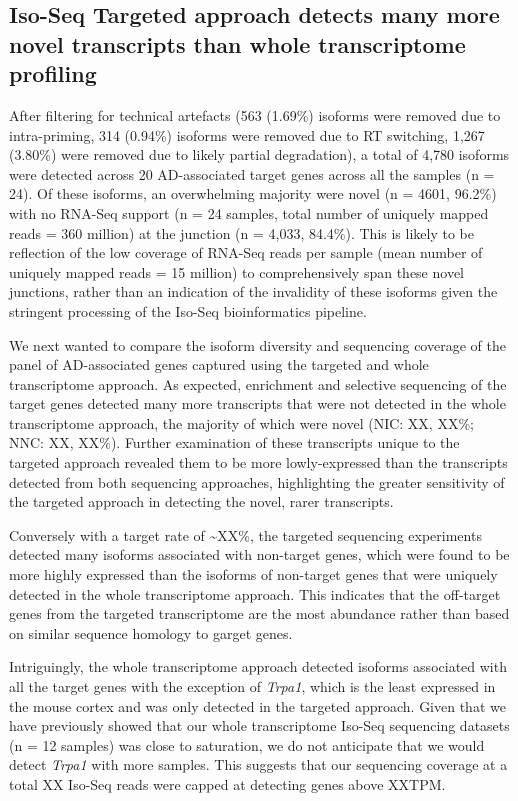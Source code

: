 \clearpage
\subsection{Iso-Seq Targeted approach detects many more novel transcripts than whole transcriptome profiling}
After filtering for technical artefacts (563 (1.69\%) isoforms were removed due to intra-priming, 314 (0.94\%) isoforms were removed due to RT switching, 1,267 (3.80\%) were removed due to likely partial degradation), a total of 4,780 isoforms were detected across 20 AD-associated target genes across all the samples (n = 24). Of these isoforms, an overwhelming majority were novel (n = 4601, 96.2\%) with no RNA-Seq support (n = 24 samples, total number of uniquely mapped reads = 360 million) at the junction (n = 4,033, 84.4\%). This is likely to be reflection of the low coverage of RNA-Seq reads per sample (mean number of uniquely mapped reads = 15 million) to comprehensively span these novel junctions, rather than an indication of the invalidity of these isoforms given the stringent processing of the Iso-Seq bioinformatics pipeline. 

We next wanted to compare the isoform diversity and sequencing coverage of the panel of AD-associated genes captured using the targeted and whole transcriptome approach. As expected, enrichment and selective sequencing of the target genes detected many more transcripts that were not detected in the whole transcriptome approach, the majority of which were novel (NIC: XX, XX\%; NNC: XX, XX\%). Further examination of these transcripts unique to the targeted approach revealed them to be more lowly-expressed than the transcripts detected from both sequencing approaches, highlighting the greater sensitivity of the targeted approach in detecting the novel, rarer transcripts. 

Conversely with a target rate of \textasciitilde{XX\%}, the targeted sequencing experiments detected many isoforms associated with non-target genes, which were found to be more highly expressed than the isoforms of non-target genes that were uniquely detected in the whole transcriptome approach. This indicates that the off-target genes from the targeted transcriptome are the most abundance rather than based on similar sequence homology to garget genes. 

Intriguingly, the whole transcriptome approach detected isoforms associated with all the target genes with the exception of \textit{Trpa1}, which is the least expressed in the mouse cortex and was only detected in the targeted approach.  Given that we have previously showed that our whole transcriptome Iso-Seq sequencing datasets (n = 12 samples) was close to saturation, we do not anticipate that we would detect \textit{Trpa1} with more samples. This suggests that our sequencing coverage at a total XX Iso-Seq reads were capped at detecting genes above XXTPM.   

